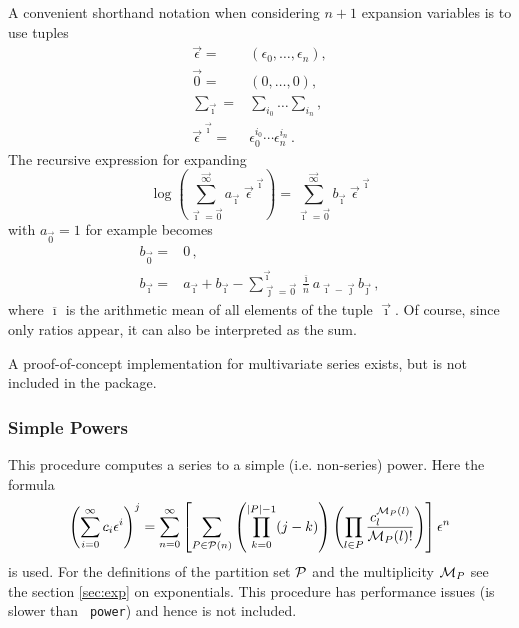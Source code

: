 \documentclass{article}
\begin{document}
A convenient shorthand notation when considering $n+1$ expansion variables is to
use tuples
\begin{align}
\label{eq:multivar_conv}
\vec{\epsilon}=&(\epsilon_0,\dots,\epsilon_n), \\
\vec{0}=&(0,\dots,0), \\
\sum_{\vec{\imath}}=&\sum_{i_0}\dots\sum_{i_n}, \\
\vec{\epsilon}^{\;\vec{\imath}} =& \epsilon_0^{i_0 }\cdots\epsilon_n^{i_n}\,.
\end{align}
The recursive expression for expanding
\begin{equation}
  \label{eq:log_multivar}
\log\left(\sum_{\vec{\imath}=\vec{0}}^{\vec{\infty}}a_{\vec{\imath}}\;
 \vec{\epsilon}^{\;\vec{\imath}}\right)=\sum_{\vec{\imath}=\vec{0}}^{\vec{\infty}} b_{\vec{\imath}}\;\vec{\epsilon}^{\;\vec{\imath}}
 \end{equation}
with $a_{\vec{0}}=1$ for example becomes
\begin{align}
  \label{eq:rec_log_multivar}
  b_{\vec{0}}=&0\,,\\
b_{\vec{\imath}}=&a_{\vec{\imath}}+b_{\vec{\imath}}-\sum_{\vec{\jmath}=\vec{0}}^{\vec{\imath}}
\frac{\overline{\imath}}{\overline{n}} a_{\vec{\imath}-\vec{\jmath}} b_{\vec{\jmath}}\,,
 \end{align}
where $\overline{\imath}$ is the arithmetic mean of all elements of the tuple
$\vec{\imath}$. Of course, since only ratios appear, it can also be
interpreted as the sum.

A proof-of-concept implementation for multivariate series exists, but is
not included in the package.

\subsubsection{Simple Powers}
\label{sec:impl_simpl_pow}

This procedure computes a series to a simple
(i.e. non-series) power. Here the formula
\begin{equation}
  \label{eq:simpl_pow}
  \left(\sum_{i=0}^{\infty}c_i \epsilon^i\right)^j = \sum_{n=0}^\infty
  \left[\sum_{P \in {\cal P}(n)}\left(\prod_{k=0}^{|P|-1}
    (j-k)\right)\left(\prod_{l \in P} \frac{c^{{\cal M}_P(l)}_l}{{\cal M}_P(l)!} \right)\right]\epsilon^n
\end{equation}
is used. For the definitions of the partition set ${\cal P}$ and the
multiplicity ${\cal M}_P$ see the section \ref{sec:exp} on
exponentials. This procedure has performance issues (is slower than {\tt
  power}) and hence is not included.
\end{document}
